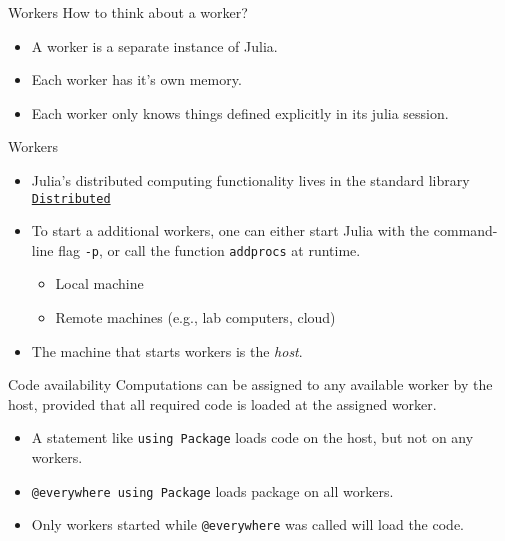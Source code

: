 \documentclass[10pt]{beamer}
\begin{document}
\begin{frame}{Workers}{}
	How to think about a worker?

	\begin{itemize}
		\item A worker is a separate instance of Julia.
		\item Each worker has it's own memory.
		\item Each worker only knows things defined explicitly in its julia session.
	\end{itemize}
\end{frame}

\begin{frame}{Workers}{}
	\begin{itemize}
		\item Julia's distributed computing functionality lives in the standard library \href{https://docs.julialang.org/en/v1/stdlib/Distributed/}{\texttt{Distributed}}
		\item To start a additional workers, one can either start Julia with the command-line flag \texttt{-p}, or call the function \texttt{addprocs} at runtime.
		\begin{itemize}
			\item Local machine
			\item Remote machines (e.g., lab computers, cloud)
		\end{itemize}
		\item The machine that starts workers is the \emph{host}.
	\end{itemize}

\end{frame}
\begin{frame}{Code availability}{}
	Computations can be assigned to any available worker by the host, provided that all required code is loaded at the assigned worker.
	\begin{itemize}
		\item A statement like \texttt{using Package} loads code on the host, but not on any workers.
		\item \texttt{@everywhere using Package} loads package on all workers.
		\item Only workers started while \texttt{@everywhere} was called will load the code.
	\end{itemize}
\end{frame}
\end{document}
